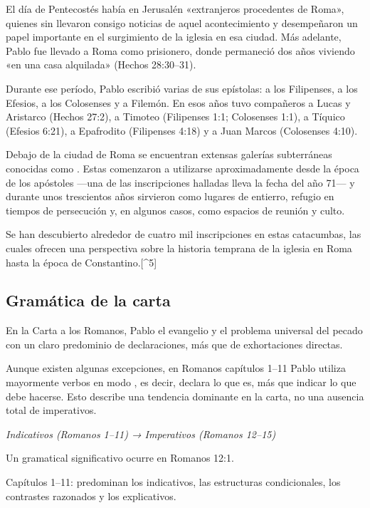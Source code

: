 El día de Pentecostés había en Jerusalén «extranjeros procedentes de
Roma», quienes sin  llevaron consigo noticias de aquel
acontecimiento y desempeñaron un papel importante en el surgimiento de
la iglesia en esa ciudad. Más adelante, Pablo fue llevado a Roma como
prisionero, donde permaneció dos años viviendo «en una casa alquilada»
(Hechos 28:30--31).

Durante ese período, Pablo escribió varias de sus epístolas: a los
Filipenses, a los Efesios, a los Colosenses y a Filemón. En esos años
tuvo  compañeros a Lucas y Aristarco (Hechos 27:2), a
Timoteo (Filipenses 1:1; Colosenses 1:1), a Tíquico (Efesios 6:21), a
Epafrodito (Filipenses 4:18) y a Juan Marcos (Colosenses 4:10).

Debajo de la ciudad de Roma se encuentran extensas galerías subterráneas
conocidas como . Estas comenzaron a utilizarse
aproximadamente desde la época de los apóstoles ---una de las
inscripciones halladas lleva la fecha del año 71--- y durante unos
trescientos años sirvieron como lugares de entierro, refugio en tiempos
de persecución y, en algunos casos, como espacios de reunión y culto.

Se han descubierto alrededor de cuatro mil inscripciones en estas
catacumbas, las cuales ofrecen una perspectiva  sobre la
historia temprana de la iglesia en Roma hasta la época de
Constantino.{[}\^{}5{]}

\subsection{Gramática de la carta}\label{gramuxe1tica-de-la-carta}

En la Carta a los Romanos, Pablo  el evangelio y el
problema universal del pecado con un claro predominio de declaraciones,
más que de exhortaciones directas.

Aunque existen algunas excepciones, en Romanos capítulos 1--11 Pablo
utiliza mayormente verbos en modo , es decir, declara
lo que es, más que indicar lo que debe hacerse. Esto describe una
tendencia dominante en la carta, no una ausencia total de imperativos.

\textit{\textit{Indicativos (Romanos 1–11) → Imperativos (Romanos 12–15)}}

Un  gramatical significativo ocurre en Romanos 12:1.

Capítulos 1--11: predominan los indicativos, las estructuras
condicionales, los contrastes razonados y los 
explicativos.

